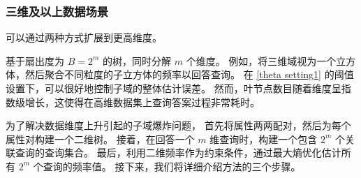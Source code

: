 \subsubsection{三维及以上数据场景}

\myahead 可以通过两种方式扩展到更高维度。

基于扇出度为 $B=2^m$ 的树，\myahead 同时分解 $m$ 个维度。
例如，\myahead 将三维域视为一个立方体，然后聚合不同粒度的子立方体的频率以回答查询。
在 \autoref{theta setting1} 的阈值设置下，\myahead 可以很好地控制子域的整体估计误差。
然而，叶节点数目随着维度呈指数级增长，这使得在高维数据集上查询答案过程非常耗时。

为了解决数据维度上升引起的子域爆炸问题，
\lle 首先将属性两两配对，然后为每个属性对构建一个二维\myahead 树。
接着，在回答一个 $m$ 维查询时，\lle 构建一个包含 $2^m$ 个关联查询的查询集合。
最后，利用二维频率作为约束条件，\lle 通过最大熵优化估计所有 $2^m$ 个查询的频率值。
接下来，我们将详细介绍\lle 方法的三个步骤。

